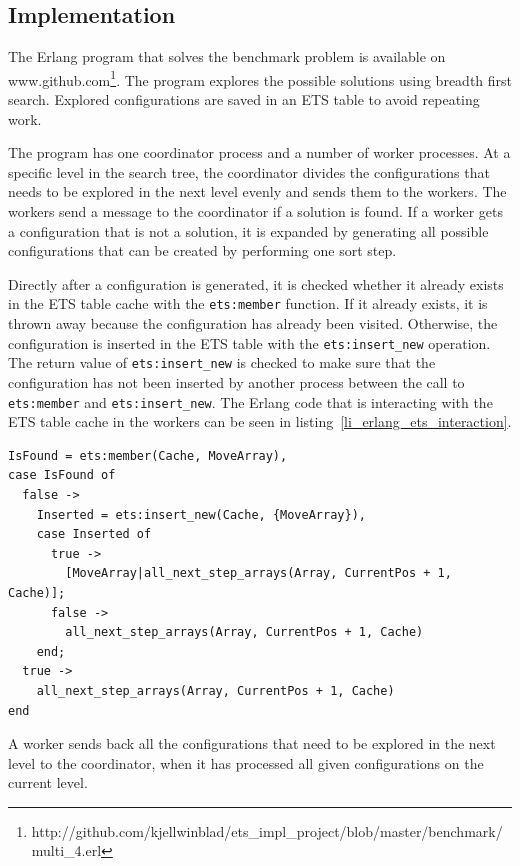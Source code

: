 \documentclass[aps,pre,preprint,nofootinbib]{revtex4}
\begin{document}
  \subsection{Implementation}
    The Erlang program that solves the benchmark problem is available on www.github.com\footnote{http://github.com/kjellwinblad/ets\_impl\_project/blob/master/benchmark/multi\_4.erl}.
    The program explores the possible solutions using breadth first search.
    Explored configurations are saved in an ETS table to avoid repeating work.

    The program has one coordinator process and a number of worker processes.
    At a specific level in the search tree, the coordinator divides the configurations that needs to be explored in the next level evenly and sends them to the workers.
    The workers send a message to the coordinator if a solution is found.
    If a worker gets a configuration that is not a solution, it is expanded by generating all possible configurations that can be created by performing one sort step.

    Directly after a configuration is generated, it is checked whether it already exists in the ETS table cache with the \verb|ets:member| function.
    If it already exists, it is thrown away because the configuration has already been visited.
    Otherwise, the configuration is inserted in the ETS table with the \verb|ets:insert_new| operation.
    The return value of \verb|ets:insert_new| is checked to make sure that the configuration has not been inserted by another process between the call to \verb|ets:member| and \verb|ets:insert_new|.
    The Erlang code that is interacting with the ETS table cache in the workers can be seen in listing~\ref{li_erlang_ets_interaction}.

    \lstset{language=erlang, caption=Worker code that is interacting with ETS, label=li_erlang_ets_interaction}
\begin{lstlisting}[float=htb]
IsFound = ets:member(Cache, MoveArray),
case IsFound of
  false ->
    Inserted = ets:insert_new(Cache, {MoveArray}),
    case Inserted of
      true ->
        [MoveArray|all_next_step_arrays(Array, CurrentPos + 1, Cache)];
      false ->
        all_next_step_arrays(Array, CurrentPos + 1, Cache)
    end;
  true ->
    all_next_step_arrays(Array, CurrentPos + 1, Cache)
end
\end{lstlisting}

    A worker sends back all the configurations that need to be explored in the next level to the coordinator, when it has processed all given configurations on the current level.
\end{document}
